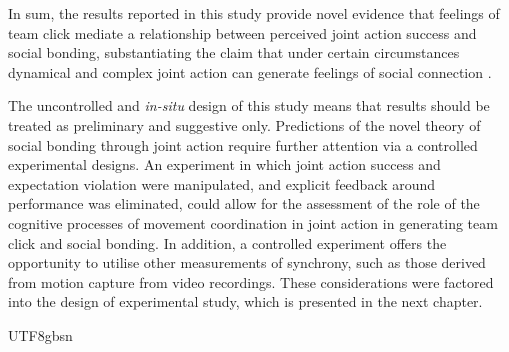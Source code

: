 \begin{CJK}{UTF8}{gbsn}
In sum, the results reported in this study provide novel evidence that feelings of team click mediate a relationship between perceived joint action success and social bonding, substantiating the claim that under certain circumstances dynamical and complex joint action can generate feelings of social connection \citep{Marsh2009}.

The uncontrolled and \textit{in-situ} design of this study means that results should be treated as preliminary and suggestive only.  Predictions of the novel theory of social bonding through joint action require further attention via a controlled experimental designs.  An experiment in which joint action success and expectation violation were manipulated, and explicit feedback around performance was eliminated, could allow for the assessment of the role of the cognitive processes of movement coordination in joint action in generating team click and social bonding.  In addition, a controlled experiment offers the opportunity to utilise other measurements of synchrony, such as those derived from motion capture from video recordings.  These considerations were factored into the design of experimental study, which is presented in the next chapter.


                                                \end{CJK}{UTF8}{gbsn}
